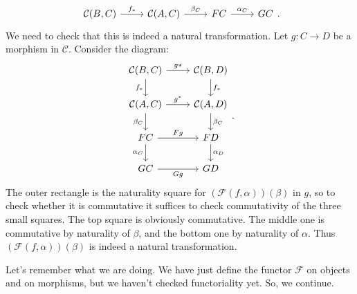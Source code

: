 \documentclass{report}
\theoremstyle{definition}
\theoremstyle{plain}
\theoremstyle{definition}
\begin{document}
		\[\begin{tikzcd}
			{\mathcal{C}(B,C)} & {\mathcal{C}(A,C)} & FC & GC
			\arrow["{f_*}", from=1-1, to=1-2]
			\arrow["{\beta_C}", from=1-2, to=1-3]
			\arrow["{\alpha_C}", from=1-3, to=1-4]
		\end{tikzcd}.\]
		We need to check that this is indeed a natural transformation. Let $g\colon C \to D$ be a morphism in $\mathcal{C}$. Consider the diagram:
		\[\begin{tikzcd}
			{\mathcal{C}(B,C)} & {\mathcal{C}(B,D)} \\
			{\mathcal{C}(A,C)} & {\mathcal{C}(A,D)} \\
			FC & FD \\
			GC & GD
			\arrow["{g*}", from=1-1, to=1-2]
			\arrow["Gg"', from=4-1, to=4-2]
			\arrow["{f_*}"', from=1-1, to=2-1]
			\arrow["{\beta_C}"', from=2-1, to=3-1]
			\arrow["{\alpha_C}"', from=3-1, to=4-1]
			\arrow["{f_*}", from=1-2, to=2-2]
			\arrow["{\beta_C}", from=2-2, to=3-2]
			\arrow["{\alpha_D}", from=3-2, to=4-2]
			\arrow["Fg", from=3-1, to=3-2]
			\arrow["{g^*}", from=2-1, to=2-2]
		\end{tikzcd}.\]
		The outer rectangle is the naturality square for $(\mathscr{F}(f,\alpha))(\beta)$ in $g$, so to check whether it is commutative it suffices to check commutativity of the three small squares. The top square is obviously commutative. The middle one is commutative by naturality of $\beta$, and the bottom one by naturality of $\alpha$. Thus $(\mathscr{F}(f,\alpha))(\beta)$ is indeed a natural transformation.
		
		Let's remember what we are doing. We have just define the functor $\mathscr{F}$ on objects and on morphisms, but we haven't checked functoriality yet. So, we continue.
		
\end{document}

